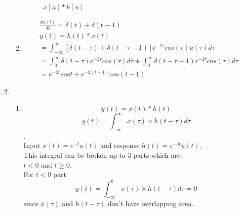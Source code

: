 \documentclass[10pt,a4paper, margin=1in]{article}
\begin{document}
\begin{enumerate}
\begin{enumerate}
    \begin{figure} [H]
    \centering
    \caption{$x[n]*h[n]$}
	\end{figure}

    \item %
    \begin{align*}
    &\frac{dx(t)}{dt} = \delta(t) + \delta(t-1) \\
    & y(t) = h(t)*x(t) \\
    &= \int_{-\infty}^{\infty}[\delta(t-\tau)+\delta(t-\tau-1)]e^{-2\tau}cos(\tau)u(\tau)d\tau \\
    &= \int_{0}^{\infty}\delta(t-\tau)e^{-2\tau}cos(\tau)d\tau + \int_{0}^{\infty}\delta(t-\tau-1)e^{-2\tau}cos(\tau)d\tau \\
    &= e^{-2t}cost + e^{-2(t-1)}cos(t-1)
    \end{align*}
    \end{enumerate}
\item      
    \begin{enumerate}
    \item %
    
    \[y(t)=x(t)*h(t)\]
    \[y(t) = \int_{-\infty}^{\infty} x(\tau) \times h(t-\tau) d\tau\].\\
    
    Input $x(t)=e^{-t}u(t)$ and response $h(t) = e^{-3t}u(t)$.\\
    This integral can be broken up to 3 parts which are:\\
    $t<0$ and  $t\geq 0$.\\
    
    For $t<0$ part:
    \[y(t) = \int_{-\infty}^{0} x(\tau) \times h(t-\tau) d\tau = 0\] since $x(\tau)$ and $h(t-\tau)$ don't have overlapping area.\\
    

\end{enumerate}
\end{enumerate}
\end{document}
